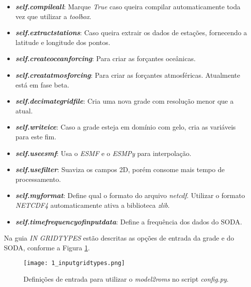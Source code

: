 \begin{itemize}
\item \textbf{\textit{self.compileall}}: Marque \textit{True} caso queira compilar automaticamente toda vez que utilizar a \textit{toolbox}.
\item \textbf{\textit{self.extractstations}}: Caso queira extrair os dados de estações, fornecendo a latitude e longitude dos pontos.
\item \textbf{\textit{self.createoceanforcing}}: Para criar as forçantes oceânicas.
\item \textbf{\textit{self.creatatmosforcing}}: Para criar as forçantes atmosféricas. Atualmente está em fase beta.
\item \textbf{\textit{self.decimategridfile}}: Cria uma nova grade com resolução menor que a atual.
\item \textbf{\textit{self.writeice}}: Caso a grade esteja em domínio com gelo, cria as variáveis para este fim.
\item \textbf{\textit{self.useesmf}}: Usa o \textit{ESMF} e o \textit{ESMPy} para interpolação.
\item \textbf{\textit{self.usefilter}}: Suaviza os campos 2D, porém consome mais tempo de processamento.
\item \textbf{\textit{self.myformat}}: Define qual o formato do arquivo \textit{netcdf}. Utilizar o formato \textit{NETCDF4} automaticamente ativa a biblioteca \textit{zlib}.
\item \textbf{\textit{self.timefrequencyofinputdata}}: Define a frequência dos dados do SODA.
\end{itemize}
\bigskip

\noindent Na guia \textit{IN GRIDTYPES} estão descritas as opções de entrada da grade e do SODA, conforme a Figura \textcolor{bleu_cite}{\ref{inputmodel2roms}}.
\bigskip

\begin{figure}[H]
    \centering
    \captionsetup{justification=centering}
    \texttt{[image: 1\_inputgridtypes.png]}
    \caption{Definições de entrada para utilizar o \textit{model2roms} no script \textit{config.py}.}
    \label{inputmodel2roms}
\end{figure}
\bigskip

